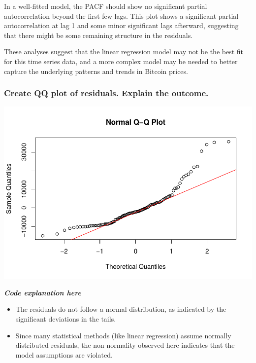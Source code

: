 \documentclass[
]{book}
\newenvironment{Shaded}{\begin{snugshade}}{\end{snugshade}}
\newcommand{\AttributeTok}[1]{\textcolor[rgb]{0.13,0.29,0.53}{#1}}
\newcommand{\CommentTok}[1]{\textcolor[rgb]{0.56,0.35,0.01}{\textit{#1}}}
\newcommand{\FunctionTok}[1]{\textcolor[rgb]{0.13,0.29,0.53}{\textbf{#1}}}
\newcommand{\NormalTok}[1]{#1}
\newcommand{\SpecialCharTok}[1]{\textcolor[rgb]{0.81,0.36,0.00}{\textbf{#1}}}
\newcommand{\StringTok}[1]{\textcolor[rgb]{0.31,0.60,0.02}{#1}}
\providecommand{\tightlist}{%
  \setlength{\itemsep}{0pt}\setlength{\parskip}{0pt}}
\begin{document}
In a well-fitted model, the PACF should show no significant partial autocorrelation beyond the first few lags.
This plot shows a significant partial autocorrelation at lag 1 and some minor significant lags afterward, suggesting that there might be some remaining structure in the residuals.

These analyses suggest that the linear regression model may not be the best fit for this time series data, and a more complex model may be needed to better capture the underlying patterns and trends in Bitcoin prices.

\subsubsection{Create QQ plot of residuals. Explain the outcome.}\label{create-qq-plot-of-residuals.-explain-the-outcome.}

\begin{Shaded}
\end{Shaded}

\includegraphics{bookdown-demo_files/figure-latex/unnamed-chunk-28-1.pdf}

\emph{\textbf{Code explanation here}}

\begin{itemize}
\tightlist
\item
  The residuals do not follow a normal distribution, as indicated by the significant deviations in the tails.
\item
  Since many statistical methods (like linear regression) assume normally distributed residuals, the non-normality observed here indicates that the model assumptions are violated.
\end{itemize}
\end{document}
